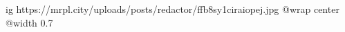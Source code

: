  
 
 
 
 

\ifcmt
  ig https://mrpl.city/uploads/posts/redactor/ffb8sy1ciraiopej.jpg
  @wrap center
  @width 0.7
\fi
